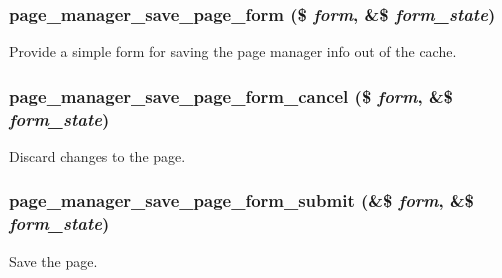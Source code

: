 {\subsubsection[{page\_\-manager\_\-save\_\-page\_\-form}]{\setlength{\rightskip}{0pt plus 5cm}page\_\-manager\_\-save\_\-page\_\-form (\$ {\em form}, \/  \&\$ {\em form\_\-state})}}
\label{page__manager_8admin_8inc_a0cebbb105c27764a960d2acfacd484bf}
Provide a simple form for saving the page manager info out of the cache. \hypertarget{page__manager_8admin_8inc_ae247c3127a873439c9e6bed5fd4453be}{
\subsubsection[{page\_\-manager\_\-save\_\-page\_\-form\_\-cancel}]{\setlength{\rightskip}{0pt plus 5cm}page\_\-manager\_\-save\_\-page\_\-form\_\-cancel (\$ {\em form}, \/  \&\$ {\em form\_\-state})}}
\label{page__manager_8admin_8inc_ae247c3127a873439c9e6bed5fd4453be}
Discard changes to the page. \hypertarget{page__manager_8admin_8inc_aac2241c9cd0ac721d93f4c904a1a1293}{
\subsubsection[{page\_\-manager\_\-save\_\-page\_\-form\_\-submit}]{\setlength{\rightskip}{0pt plus 5cm}page\_\-manager\_\-save\_\-page\_\-form\_\-submit (\&\$ {\em form}, \/  \&\$ {\em form\_\-state})}}
\label{page__manager_8admin_8inc_aac2241c9cd0ac721d93f4c904a1a1293}
Save the page. 